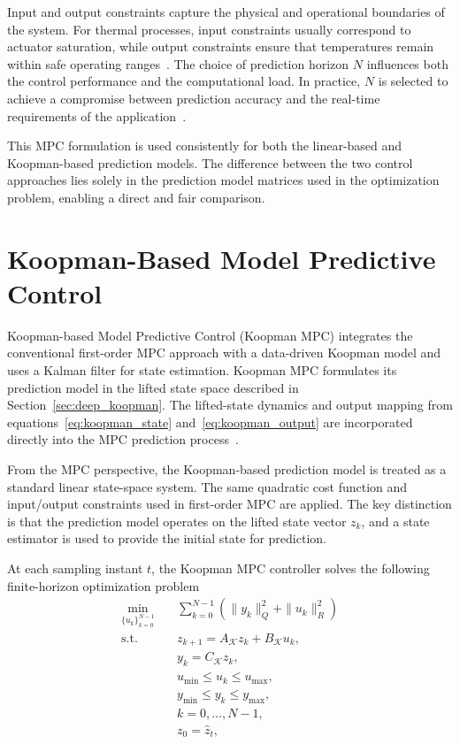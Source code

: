  

Input and output constraints capture the physical and operational boundaries of the system. For thermal processes, input constraints usually correspond to actuator saturation, while output constraints ensure that temperatures remain within safe operating ranges \cite{rawlings_mpc, martin2019mpc}.
The choice of prediction horizon $N$ influences both the control performance and the computational load. In practice, $N$ is selected to achieve a compromise between prediction accuracy and the real-time requirements of the application \cite{rawlings_mpc}.

This MPC formulation is used consistently for both the linear-based and Koopman-based prediction models. The difference between the two control approaches lies solely in the prediction model matrices used in the optimization problem, enabling a direct and fair comparison.





\section{Koopman-Based Model Predictive Control}

Koopman-based Model Predictive Control (Koopman MPC) integrates the conventional first-order MPC approach with a data-driven Koopman model and uses a Kalman filter for state estimation. Koopman MPC formulates its prediction model in the lifted state space described in Section~\ref{sec:deep_koopman}. The lifted-state dynamics and output mapping from equations~\eqref{eq:koopman_state} and~\eqref{eq:koopman_output} are incorporated directly into the MPC prediction process \cite{korda2018,koopman_mpc_review}.

From the MPC perspective, the Koopman-based prediction model is treated as a standard linear state-space system. The same quadratic cost function and input/output constraints used in first-order MPC are applied. The key distinction is that the prediction model operates on the lifted state vector $z_k$, and a state estimator is used to provide the initial state for prediction.

At each sampling instant $t$, the Koopman MPC controller solves the following finite-horizon optimization problem
\begin{equation}
\begin{aligned}
\min_{\{u_k\}_{k=0}^{N-1}} \quad &
\sum_{k=0}^{N-1}
\left(
\|y_k\|_Q^2 + \|u_k\|_R^2
\right) \\
\text{s.t.} \quad
& z_{k+1} = A_{\mathcal{K}} z_k + B_{\mathcal{K}} u_k, \\
& y_k = C_{\mathcal{K}} z_k, \\
& u_{\min} \le u_k \le u_{\max}, \\
& y_{\min} \le y_k \le y_{\max}, \\
& k = 0,\ldots,N-1, \\
& z_0 = \hat{z}_t,
\end{aligned}
\label{eq:koopman_mpc_optimization}
\end{equation}

